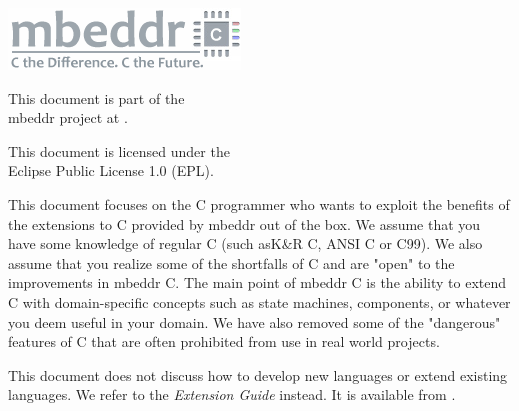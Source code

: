 \documentclass[12pt,parskip,a4paper,final,oneside,numbers=noenddot,headsepline]{scrbook}
\newcommand{\changefont}[3]{\fontfamily{#1}\fontseries{#2}\fontshape{#3}\selectfont}
\newcommand{\ic}[1]{\changefont{cmtt}{m}{n}{#1}\normalfont}  %
\begin{document}
\vspace{50mm}


\begin{center} 
  \includegraphics{logoWithSlogan.png}

\vspace{5mm}
This document is part of the \\ 
mbeddr project at \ic{http://mbeddr.com}. 

\vspace{5mm}
This document is licensed under the \\ 
Eclipse Public License 1.0 (EPL).
\end{center}

This document focuses on the C programmer who wants to exploit the benefits of
the extensions to C provided by mbeddr out of the box. We assume that you have
some knowledge of regular C (such asK\&R C, ANSI C or C99). We also assume that
you realize some of the shortfalls of C and are "open" to the improvements in
mbeddr C. The main point of mbeddr C is the ability to extend C with
domain-specific concepts such as state machines, components, or whatever you
deem useful in your domain. We have also removed some of the "dangerous"
features of C that are often prohibited from use in real world projects.

This document does not discuss how to develop new languages or extend existing
languages. We refer to the \emph{Extension Guide} instead. It is available from
\ic{http://mbeddr.com}.



\setcounter{tocdepth}{2}
\tableofcontents %
 

\mainmatter %

 
\end{document}
